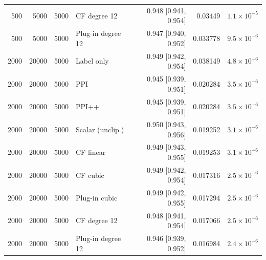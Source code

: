 {\begin{longtable}{rrrlrrr}
500 & 5000 & 5000 & CF degree 12 & 0.948 [0.941, 0.954] & 0.03449 & $1.1\times 10^{-5}$ \\
500 & 5000 & 5000 & Plug-in degree 12 & 0.947 [0.940, 0.952] & 0.033778 & $9.5\times 10^{-6}$ \\
2000 & 20000 & 5000 & Label only & 0.949 [0.942, 0.954] & 0.038149 & $4.8\times 10^{-6}$ \\
2000 & 20000 & 5000 & PPI & 0.945 [0.939, 0.951] & 0.020284 & $3.5\times 10^{-6}$ \\
2000 & 20000 & 5000 & PPI++ & 0.945 [0.939, 0.951] & 0.020284 & $3.5\times 10^{-6}$ \\
2000 & 20000 & 5000 & Scalar (unclip.) & 0.950 [0.943, 0.956] & 0.019252 & $3.1\times 10^{-6}$ \\
2000 & 20000 & 5000 & CF linear & 0.949 [0.943, 0.955] & 0.019253 & $3.1\times 10^{-6}$ \\
2000 & 20000 & 5000 & CF cubic & 0.949 [0.942, 0.954] & 0.017316 & $2.5\times 10^{-6}$ \\
2000 & 20000 & 5000 & Plug-in cubic & 0.949 [0.942, 0.955] & 0.017294 & $2.5\times 10^{-6}$ \\
2000 & 20000 & 5000 & CF degree 12 & 0.948 [0.941, 0.954] & 0.017066 & $2.5\times 10^{-6}$ \\
2000 & 20000 & 5000 & Plug-in degree 12 & 0.946 [0.939, 0.952] & 0.016984 & $2.4\times 10^{-6}$ \\
\end{longtable}}
